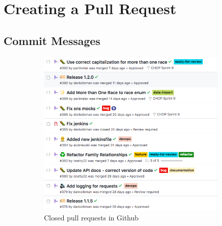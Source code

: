\documentclass[a4paper,12pt,titlepage]{scrartcl}
\begin{document}
	\section{Creating a Pull Request}
	
	\subsection{Commit Messages}\label{commits}
	
	\begin{figure}
	\centering
   	\begin{subfigure}[h]{0.4\textwidth}
    		\centering
    		\includegraphics[width=\textwidth]{images/prhistory.png}
    		\caption{Closed pull requests in Github}
    		\label{fig:prhistory}
    	\end{subfigure}
    	 \hfill
  	\begin{subfigure}[h]{0.4\textwidth}
    		\centering

\end{subfigure}
\end{figure}
\end{document}
